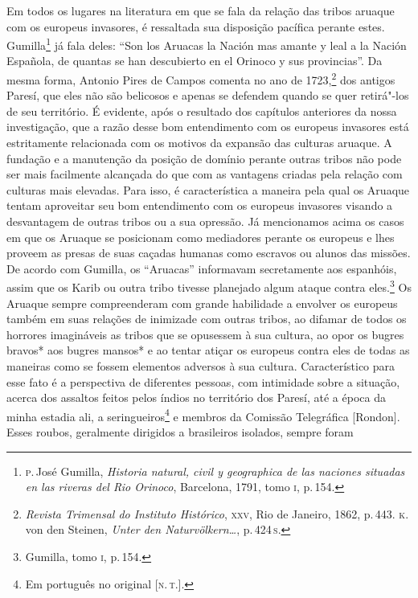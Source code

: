 Em todos os lugares na literatura em que se fala da relação das tribos
aruaque com os europeus invasores, é ressaltada sua disposição pacífica
perante estes. Gumilla\footnote{\textsc{p}.\,José Gumilla, \textit{Historia
  natural, civil y geographica de las naciones situadas en las riveras
  del Rio Orinoco}, Barcelona, 1791, tomo \textsc{i}, p.\,154.} já fala deles:
``Son los Aruacas la Nación mas amante y leal a la Nación Española, de
quantas se han descubierto en el Orinoco y sus provincias''. Da mesma
forma, Antonio Pires de Campos comenta no ano de 1723,\footnote{\textit{Revista
  Trimensal do Instituto Histórico}, \textsc{xxv}, Rio de Janeiro, 1862, p.\,443.
  \textsc{k}.\,von den Steinen, \textit{Unter den Naturvölkern\ldots}, p.\,424\,\textsc{s}.} dos
antigos Paresí, que eles não são belicosos e apenas se defendem quando
se quer retirá"-los de seu território. É evidente, após o resultado dos
capítulos anteriores da nossa investigação, que a razão desse bom
entendimento com os europeus invasores está estritamente relacionada
com os motivos da expansão das culturas aruaque. A fundação e a
manutenção da posição de domínio perante outras tribos não pode ser mais
facilmente alcançada do que com as vantagens criadas pela relação com
culturas mais elevadas. Para isso, é característica a maneira pela qual
os Aruaque tentam aproveitar seu bom entendimento com os europeus
invasores visando a desvantagem de outras tribos ou a sua opressão. Já
mencionamos acima os casos em que os Aruaque se posicionam como
mediadores perante os europeus e lhes proveem as presas de suas caçadas
humanas como escravos ou alunos das missões. De acordo com Gumilla, os
``Aruacas'' informavam secretamente aos espanhóis, assim que os Karib
ou outra tribo tivesse planejado algum ataque contra eles.\footnote{Gumilla, tomo \textsc{i}, p.\,154.} Os Aruaque sempre
compreenderam com grande habilidade a envolver os europeus também em
suas relações de inimizade com outras tribos, ao difamar de todos os
horrores imagináveis as tribos que se opusessem à sua cultura, ao opor
os bugres bravos* aos bugres mansos* e ao tentar atiçar os europeus
contra eles de todas as maneiras como se fossem elementos adversos à sua
cultura. Característico para esse fato é a perspectiva de diferentes
pessoas, com intimidade sobre a situação, acerca dos assaltos feitos
pelos índios no território dos Paresí, até a época da minha estadia
ali, a seringueiros\footnote{Em português no original {[}\textsc{n.\,t.}{]}.} e membros da Comissão Telegráfica {[}Rondon{]}.
Esses roubos, geralmente dirigidos a brasileiros isolados, sempre foram
